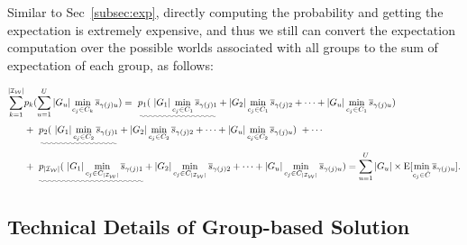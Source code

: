 Similar to Sec~\ref{subsec:exp}, directly computing the probability and getting the expectation is extremely expensive, and thus we still can convert the expectation computation over the possible worlds associated with all groups to the sum of expectation of each group, as follows:

\begin{equation}\label{eqa:cluster-4}
	\begin{aligned}
		\sum_{k= 1}^{|\worlds|} & p_k (\sum_{u=1}^U  |\group_u|  \min_{c_j\in C_k} \overline{s}_{\gamma(j)u}) =~  \uwave{p_1(~|G_1|\min_{c_j\in C_1}\overline{s}_{\gamma(j)1}} + |G_2|\min_{c_j\in C_1}\overline{s}_{\gamma(j)2} + \cdots + |G_u|\min_{c_j\in C_1}\overline{s}_{\gamma(j)u})  \\
		 &   + ~ \uwave{p_2(~|G_1|\min_{c_j\in C_2}\overline{s}_{\gamma(j)1}} + |G_2|\min_{c_j\in C_2}\overline{s}_{\gamma(j)2} + \cdots + |G_u|\min_{c_j\in C_2}\overline{s}_{\gamma(j)u})  ~ + \cdots \\
		  &   + ~ \uwave{p_{|\worlds|}(~|G_1|\min_{c_j\in C_{|\worlds|}}\overline{s}_{\gamma(j)1}} + |G_2|\min_{c_j\in C_{|\worlds|}}\overline{s}_{\gamma(j)2} + \cdots + |G_u|\min_{c_j\in C_{|\worlds|}}\overline{s}_{\gamma(j)u})  = \sum_{u=1}^U  |\group_u| \times\mathrm{E}[\min_{c_j\in \hat{\core}}\overline{s}_{\gamma(j)u}].
	\end{aligned}
\end{equation}

\subsection{Technical Details of Group-based Solution}

\vspace{.5em}

